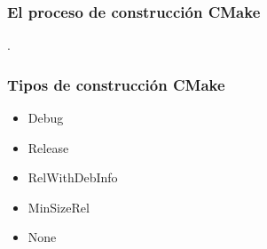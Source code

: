 


		
		




\begin{frame}[fragile]
	\frametitle{El proceso de construcción CMake}
	.
\end{frame}

\begin{frame}[fragile]
	\frametitle{Tipos de construcción CMake}

	\begin{itemize}
		\item
		
		Debug

		\item
		
		Release

		\item
		
		RelWithDebInfo

		\item
		
		MinSizeRel

		\item
		
		None
	\end{itemize}
\end{frame}


